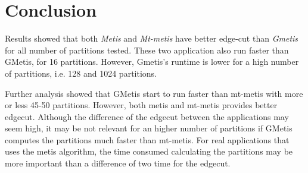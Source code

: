 \documentclass[abstract=on,9pt,twocolumn]{scrartcl}
\begin{document}

\section{Conclusion}
\label{sec:conc}
Results showed that both \textit{Metis} and \textit{Mt-metis} have
better edge-cut than \textit{Gmetis} for all number of partitions tested. 
These two application also run faster than GMetis, for 16 partitions.
However, Gmetis's runtime is lower for a high number of partitions, i.e.
128 and 1024 partitions.

Further analysis showed that GMetis start to run faster than mt-metis
with more or less 45-50 partitions. However, both metis and mt-metis provides
better edgecut.
Although the difference of the edgecut between the applications may seem
high, it may be not relevant for an higher number of partitions if
GMetis computes the partitions much faster than mt-metis. For real
applications that uses the metis algorithm, the time consumed
calculating the partitions may be more important than a difference of
two time for the edgecut.




\end{document}
